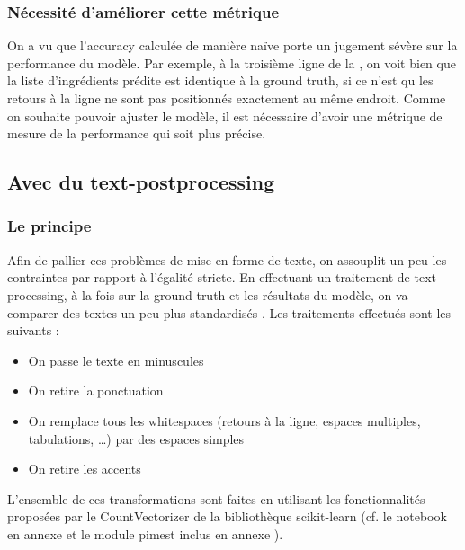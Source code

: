                 \subsubsection{Nécessité d'améliorer cette métrique}
                On a vu que l'accuracy calculée de manière naïve porte un jugement sévère sur la performance du modèle.
                Par exemple, à la troisième ligne de la , on voit bien que la liste d'ingrédients prédite est identique à la ground truth, si ce n'est qu les retours à la ligne ne sont pas positionnés exactement au même endroit.
                Comme on souhaite pouvoir ajuster le modèle, il est nécessaire d'avoir une métrique de mesure de la performance qui soit plus précise.

            \subsection{Avec du \og text-postprocessing \fg}
            \label{text_postprocessing}

                \subsubsection{Le principe}
                Afin de pallier ces problèmes de mise en forme de texte, on assouplit un peu les contraintes par rapport à l'égalité stricte.
                En effectuant un traitement de text processing, à la fois sur la ground truth et les résultats du modèle, on va comparer des textes un peu plus \og standardisés \fg.
                Les traitements effectués sont les suivants :
                \begin{itemize}
                    \item On passe le texte en minuscules
                    \item On retire la ponctuation
                    \item On remplace tous les \og whitespaces \fg (retours à la ligne, espaces multiples, tabulations, \dots) par des espaces simples
                    \item On retire les accents
                \end{itemize}
                L'ensemble de ces transformations sont faites en utilisant les fonctionnalités proposées par le CountVectorizer de la bibliothèque scikit-learn (cf. le notebook en annexe  et le module pimest inclus en annexe ).

